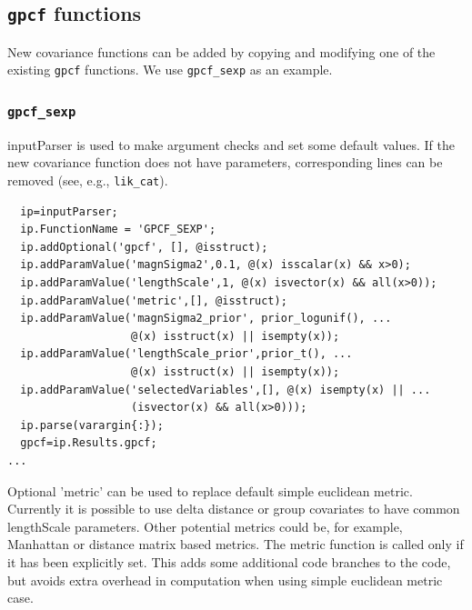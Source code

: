 \documentclass[twoside,11pt]{article}
\newcommand{\code}[1]{{\normalfont\texttt{#1}}}
\begin{document}
\subsection{\code{gpcf} functions}

New covariance functions can be added by copying and modifying one of the
existing \code{gpcf} functions. We use \code{gpcf\_sexp} as an
example.

\subsubsection{\code{gpcf\_sexp}}

inputParser is used to make argument checks and set some default
values. If the new covariance function does not have parameters,
corresponding lines can be removed (see, e.g.,
\code{lik\_cat}).
\begin{verbatim}
  ip=inputParser;
  ip.FunctionName = 'GPCF_SEXP';
  ip.addOptional('gpcf', [], @isstruct);
  ip.addParamValue('magnSigma2',0.1, @(x) isscalar(x) && x>0);
  ip.addParamValue('lengthScale',1, @(x) isvector(x) && all(x>0));
  ip.addParamValue('metric',[], @isstruct);
  ip.addParamValue('magnSigma2_prior', prior_logunif(), ...
                   @(x) isstruct(x) || isempty(x));
  ip.addParamValue('lengthScale_prior',prior_t(), ...
                   @(x) isstruct(x) || isempty(x));
  ip.addParamValue('selectedVariables',[], @(x) isempty(x) || ...
                   (isvector(x) && all(x>0)));
  ip.parse(varargin{:});
  gpcf=ip.Results.gpcf;
...
\end{verbatim}

Optional 'metric' can be used to replace default simple euclidean
metric. Currently it is possible to use delta distance or group
covariates to have common lengthScale parameters. Other potential
metrics could be, for example, Manhattan or distance matrix based
metrics. The metric function is called only if it has been
explicitly set. This adds some additional code branches to the
code, but avoids extra overhead in computation when using simple
euclidean metric case.
\end{document}
